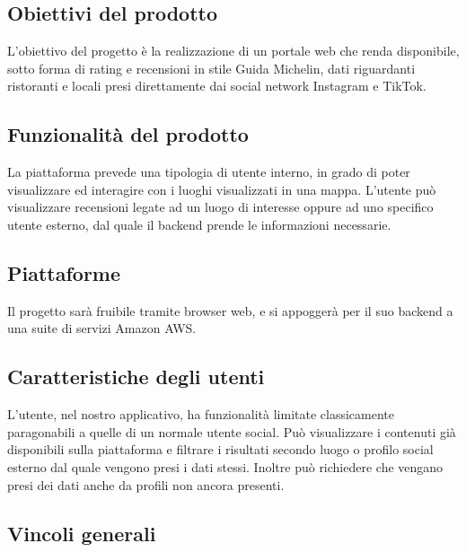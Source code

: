 \subsection{Obiettivi del prodotto}
L'obiettivo del progetto è la realizzazione di un portale web che renda disponibile, 
sotto forma di rating e recensioni in stile Guida Michelin, dati riguardanti ristoranti 
e locali presi direttamente dai social network Instagram e TikTok.

\subsection{Funzionalità del prodotto}
La piattaforma prevede una tipologia di utente interno, in grado di poter visualizzare ed interagire con i luoghi visualizzati in una mappa. 
L’utente può visualizzare recensioni legate ad un luogo di interesse oppure ad uno specifico utente esterno, dal quale il backend prende le informazioni necessarie.

\subsection{Piattaforme}
Il progetto sarà fruibile tramite browser web, e si appoggerà per il suo backend a una suite di servizi Amazon AWS.

\subsection{Caratteristiche degli utenti}
L'utente, nel nostro applicativo, ha funzionalità limitate classicamente paragonabili a quelle di un normale utente social.
Può visualizzare i contenuti già disponibili sulla piattaforma e filtrare i risultati secondo luogo o profilo social esterno dal quale vengono presi i dati stessi.
Inoltre può richiedere che vengano presi dei dati anche da profili non ancora presenti.

\subsection{Vincoli generali}
